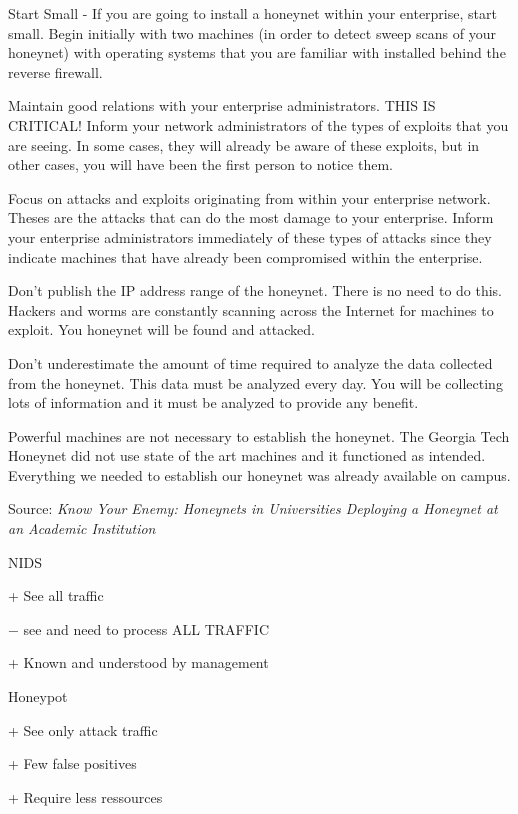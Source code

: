 \documentclass[Screen16to9,17pt]{foils}
\begin{document}
\begin{list2}
\item Start Small - If you are going to install a honeynet within your enterprise, start small. Begin initially with two machines (in order to detect sweep scans of your honeynet) with operating systems that you are familiar with installed behind the reverse firewall.
\item Maintain good relations with your enterprise administrators. THIS IS CRITICAL! Inform your network administrators of the types of exploits that you are seeing. In some cases, they will already be aware of these exploits, but in other cases, you will have been the first person to notice them.
\end{list2}

\begin{list2}
\item Focus on attacks and exploits originating from within your enterprise network. Theses are the attacks that can do the most damage to your enterprise. Inform your enterprise administrators immediately of these types of attacks since they indicate machines that have already been compromised within the enterprise.
\item Don't publish the IP address range of the honeynet. There is no need to do this. Hackers and worms are constantly scanning across the Internet for machines to exploit. You honeynet will be found and attacked.
\item Don't underestimate the amount of time required to analyze the data collected from the honeynet. This data must be analyzed every day. You will be collecting lots of information and it must be analyzed to provide any benefit.
\item Powerful machines are not necessary to establish the honeynet. The Georgia Tech Honeynet did not use state of the art machines and it functioned as intended. Everything we needed to establish our honeynet was already available on campus.
\end{list2}

Source: \emph{Know Your Enemy: Honeynets in Universities Deploying a Honeynet at an Academic Institution}


\begin{list1}
\item NIDS
\begin{list2}
\item + See all traffic
\item $-$ see and need to process ALL TRAFFIC
\item + Known and understood by management
\end{list2}
\item Honeypot
\begin{list2}
\item + See only attack traffic
\item + Few false positives
\item + Require less ressources
\end{list2}
\end{list1}
\end{document}
